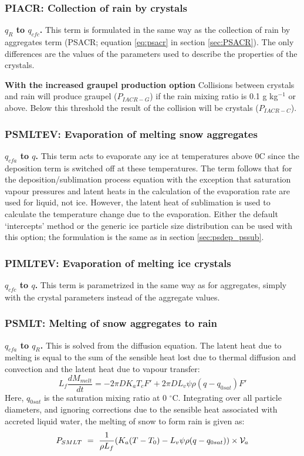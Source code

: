 \documentclass{UMDP_article}
\def\bq{\begin{equation}}
\def\eq{\end{equation}}
\begin{document}
\subsubsection{PIACR:  Collection of rain by crystals}

\textbf{$q_{R}$ to $q_{cfc}$.}
This term is formulated in the same way as the
collection of rain by aggregates term (PSACR; equation \ref{eq:psacr} in 
section \ref{sec:PSACR}). The only differences are the values of
the parameters used to describe the properties of the crystals.

\textbf{With the increased graupel production option}
Collisions between crystals and rain will produce
graupel ($P_{IACR-G}$) if the rain mixing ratio is 0.1 g kg$^{-1}$ or above. 
Below this threshold the result of the collision will be crystals 
($P_{IACR-C}$).

\subsubsection{PSMLTEV: Evaporation of melting snow aggregates}

\textbf{$q_{cfa}$ to $q$.}
This term acts to evaporate any ice at temperatures above 0\textdegree C since
the deposition term is switched off at these temperatures. The term follows that
for the deposition/sublimation process equation with the exception that
saturation vapour pressures and latent heats in the calculation of the
evaporation rate are used for liquid, not ice. However, the latent heat of
sublimation is used to calculate the temperature change due to the evaporation.
Either the default `intercepts' method or the generic ice particle size 
distribution can be used with this option; the formulation is the same as
in section \ref{sec:psdep_pssub}.


\subsubsection{PIMLTEV:  Evaporation of melting ice crystals}

\textbf{$q_{cfc}$ to $q$.}
This term is parametrized in the same way as for aggregates, simply with the 
crystal parameters instead of the aggregate values.

\subsubsection{PSMLT:  Melting of snow aggregates to rain}

\textbf{$q_{cfa}$ to $q_R$.}
This is solved from the diffusion equation. The latent heat due to melting is
equal to the sum of the sensible heat lost due to thermal diffusion and
convection and the latent heat due to vapour transfer:
\bq
 L_f \frac {dM_{melt}}{dt}=-2\pi D K_a T_c F'
                   +2\pi D L_v \psi \rho (q - q_{0sat}) F'
\eq
Here, $q_{0sat}$ is the saturation mixing ratio at 0 $^{\circ}$C.
Integrating over all particle diameters, and ignoring corrections due
to the sensible heat associated with accreted liquid water, the melting of
snow to form rain is given as:
\bq
 P_{SMLT} ~=~
\frac{1}{\rho L_f} (K_a(T-T_0)-L_v\psi\rho(q -q_{0sat}))\times{\cal V}_a
\label{eq:mic_psmlt}
\eq
\end{document}
